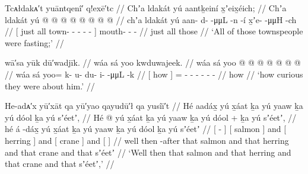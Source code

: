 \ex\label{ex:100-214-townspeople-fasting}%
%
\begingl
	\glpreamble	Tcᴀłdakᴀ′t yuāntqenî′ q!exē′tc //
	\glpreamble	Chʼa ldakát yú aantḵeiní x̱ʼeix̱éich; //
	\gla	{} Chʼa ldakát yú  @ {} @ {} @ {} @ {} @ {} {}
		 @ {} @ {} @ {} //
	\glb	{} chʼa ldakát yú aan- d-  -μμL -n -í {}
		x̱ʼe-  -μμH -ch //
	\glc	{}[ just all  town- -  - - - {}]
		mouth-  - - //
	\gld	{} just all those  {} {} {} {} {} {}
		 {} {} {} //
	\glft	‘All of those townspeople were fasting;’
		//
\endgl
\xe

\ex\label{ex:100-215-theyre-curious}%
%
\begingl
	\glpreamble	wā′sa yūk dū′wadjīk. //
	\glpreamble	wáa sá yoo kwduwajeek. //
	\gla	{} wáa sá {} 
		yoo @  @ {} @ {} @ {} @ {} @ {} @ {} //
	\glb	{} wáa sá {} 
		yoo= k- u- du- i-  -μμL -k //
	\glc	{}[ how  {}]
		= - - - -  - - //
	\gld	{} how  {} 
		  {} {} {} {} {} {} //
	\glft	‘how curious they were about him.’
		//
\endgl
\xe

\ex\label{ex:100-216-salmon-herring-crane-seet}%
%
\begingl
	\glpreamble	He-adᴀ′x yū′xāt qa yū′yao qayudū′ł qa yusîī′t //
	\glpreamble	Hé aadáx̱ yú x̱áat ḵa yú yaaw ḵa yú dóol ḵa yú sʼéetʼ, //
	\gla	Hé {}  @ {} {}
		{} yú x̱áat {}
		ḵa {} yú yaaw {}
		ḵa {} yú dóol {} +
		ḵa {} yú sʼéetʼ, {} //
	\glb	hé {} á -dáx̱ {}
		{} yú x̱áat {}
		ḵa {} yú yaaw {}
		ḵa {} yú dóol {}
		ḵa {} yú sʼéetʼ {} //
	\glc	{} {}[  - {}]
		{}[  salmon {}]
		and {}[  herring {}]
		and {}[  crane {}]
		and {}[   {}] //
	\gld	well {} then -after {}
		{} that salmon {}
		and {} that herring {}
		and {} that crane {}
		and {} that sʼéetʼ {} //
	\glft	‘Well then that salmon and that herring and that crane and that sʼéetʼ,’
		//
\endgl
\xe

